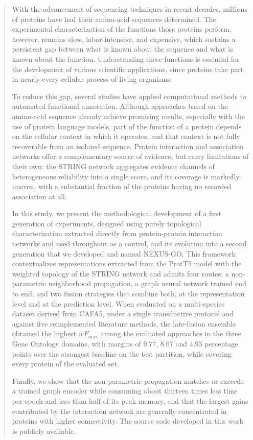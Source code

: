 \documentclass[Ingles]{ic-tese-v3}
\begin{document}
\begin{abstract}
With the advancement of sequencing techniques in recent decades, millions of proteins have had their amino-acid sequences determined. The experimental characterization of the functions those proteins perform, however, remains slow, labor-intensive, and expensive, which sustains a persistent gap between what is known about the sequence and what is known about the function. Understanding these functions is essential for the development of various scientific applications, since proteins take part in nearly every cellular process of living organisms.

To reduce this gap, several studies have applied computational methods to automated functional annotation. Although approaches based on the amino-acid sequence already achieve promising results, especially with the use of protein language models, part of the function of a protein depends on the cellular context in which it operates, and that context is not fully recoverable from an isolated sequence. Protein interaction and association networks offer a complementary source of evidence, but carry limitations of their own: the STRING network aggregates evidence channels of heterogeneous reliability into a single score, and its coverage is markedly uneven, with a substantial fraction of the proteins having no recorded association at all.

In this study, we present the methodological development of a first generation of experiments, designed using purely topological characterization extracted directly from protein-protein interaction networks and used throughout as a control, and its evolution into a second generation that we developed and named NEXUS-GO. This framework contextualizes representations extracted from the ProtT5 model with the weighted topology of the STRING network and admits four routes: a non-parametric neighborhood propagation, a graph neural network trained end to end, and two fusion strategies that combine both, at the representation level and at the prediction level. When evaluated on a multi-species dataset derived from CAFA5, under a single transductive protocol and against five reimplemented literature methods, the late-fusion ensemble obtained the highest $wF_{\max}$ among the evaluated approaches in the three Gene Ontology domains, with margins of $9.77$, $8.67$ and $4.93$ percentage points over the strongest baseline on the test partition, while covering every protein of the evaluated set.

Finally, we show that the non-parametric propagation matches or exceeds a trained graph encoder while consuming about thirteen times less time per epoch and less than half of its peak memory, and that the largest gains contributed by the interaction network are generally concentrated in proteins with higher connectivity. The source code developed in this work is publicly available.
\end{abstract}
\end{document}
